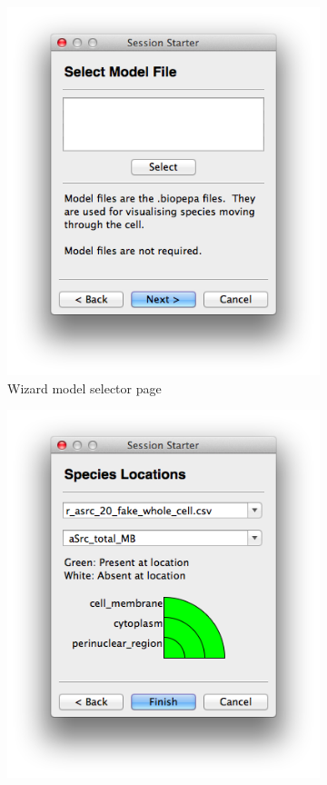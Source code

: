 \begin{figure}[h!]
    \begin{subfigure}[b]{0.4\textwidth}
        \centering
        \includegraphics[width=\textwidth]{images/wizard_page_3.png}
        \caption{Wizard model selector page}
        \label{fig:page_3}
    \end{subfigure}
    \begin{subfigure}[b]{0.4\textwidth}
        \centering
        \includegraphics[width=\textwidth]{images/wizard_page_4.png}

\end{subfigure}
\end{figure}

